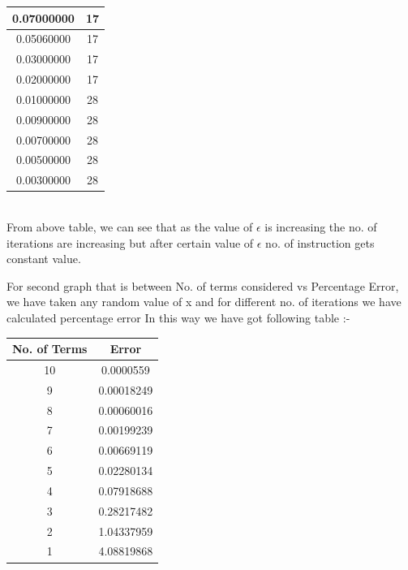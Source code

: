 \documentclass[conference]{IEEEtran}
\begin{document}
{{\begin{table}[h!]
\begin{center}
\begin{tabular}{|c|c|}
      0.07000000 & 17\\
      \hline
      0.05060000 & 17\\
      \hline
      0.03000000 & 17\\
      \hline
      0.02000000 & 17\\
      \hline
      0.01000000 & 28\\
      \hline
      0.00900000 & 28\\
      \hline
      0.00700000 & 28\\
      \hline
      0.00500000 & 28\\
      \hline
      0.00300000 & 28\\
      \hline
    \end{tabular}
\end{center}
\end{table}
\\
From above table, we can see that as the value of $\epsilon$ is increasing the no. of iterations are increasing but after certain value of $\epsilon$ no. of instruction gets constant value. 

For second graph that is between No. of terms considered vs Percentage Error, we have taken any random value of x and for different no. of iterations we have calculated percentage error In this way we have got following table :- 
\begin{table}[h!]
\begin{center}
    \label{tab:table1}
    \begin{tabular}{|c|c|} %
   \hline
     \textbf{No. of Terms} & \textbf{Error}\\
     	\hline
		10 & 0.0000559\\
      	\hline
	  	9 & 0.00018249 \\
      	\hline
		8 & 0.00060016 \\
        \hline
		7 & 0.00199239 \\
        \hline
		6 & 0.00669119 \\
        \hline
		5 & 0.02280134 \\
        \hline
		4 & 0.07918688 \\
        \hline
		3 & 0.28217482 \\
        \hline
		2 & 1.04337959 \\
        \hline
		1 & 4.08819868 \\
      	\hline
    \end{tabular}
\end{center}
\end{table}

}}
\end{document}
